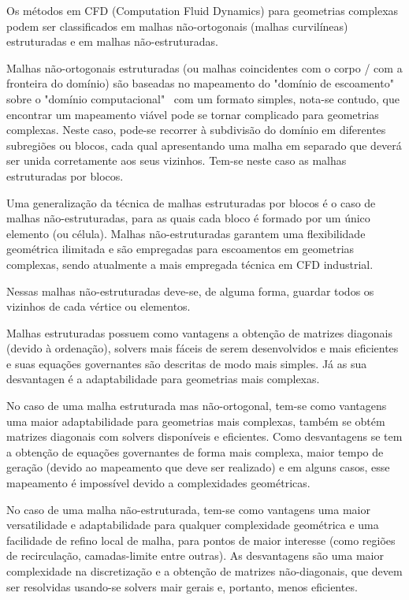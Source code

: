 Os métodos em CFD (Computation Fluid Dynamics) para geometrias complexas podem ser classificados em malhas não-ortogonais (malhas curvilíneas) estruturadas e em malhas não-estruturadas.

Malhas não-ortogonais estruturadas (ou malhas coincidentes com o corpo / com a fronteira do domínio) são baseadas no mapeamento do "domínio de escoamento" \, sobre o "domínio computacional" \, com um formato simples, nota-se contudo, que encontrar um mapeamento viável pode se tornar complicado para geometrias complexas. Neste caso, pode-se recorrer à subdivisão do domínio em diferentes subregiões ou blocos, cada qual apresentando uma malha em separado que deverá ser unida corretamente aos seus vizinhos. Tem-se neste caso as malhas estruturadas por blocos.

Uma generalização da técnica de malhas estruturadas por blocos é o caso de malhas não-estruturadas, para as quais cada bloco é formado por um único elemento (ou célula). Malhas não-estruturadas garantem uma flexibilidade geométrica ilimitada e são empregadas para escoamentos em geometrias complexas, sendo atualmente a mais empregada técnica em CFD industrial.

Nessas malhas não-estruturadas deve-se, de alguma forma, guardar todos os vizinhos de cada vértice ou elementos. \cite{Shewchuk1992}

Malhas estruturadas possuem como vantagens a obtenção de matrizes diagonais (devido à ordenação), solvers mais fáceis de serem desenvolvidos e mais eficientes e suas equações governantes são descritas de modo mais simples. Já as sua desvantagen é a adaptabilidade para geometrias mais complexas.

No caso de uma malha estruturada mas não-ortogonal, tem-se como vantagens uma maior adaptabilidade para geometrias mais complexas, também se obtém matrizes diagonais com solvers disponíveis e eficientes. Como desvantagens se tem a obtenção de equações governantes de forma mais complexa, maior tempo de geração (devido ao mapeamento que deve ser realizado) e em alguns casos, esse mapeamento é impossível devido a complexidades geométricas.

No caso de uma malha não-estruturada, tem-se como vantagens uma maior versatilidade e adaptabilidade para qualquer complexidade geométrica e uma facilidade de refino local de malha, para pontos de maior interesse (como regiões de recirculação, camadas-limite entre outras). As desvantagens são uma maior complexidade na discretização e a obtenção de matrizes não-diagonais, que devem ser resolvidas usando-se solvers mair gerais e, portanto, menos eficientes.

